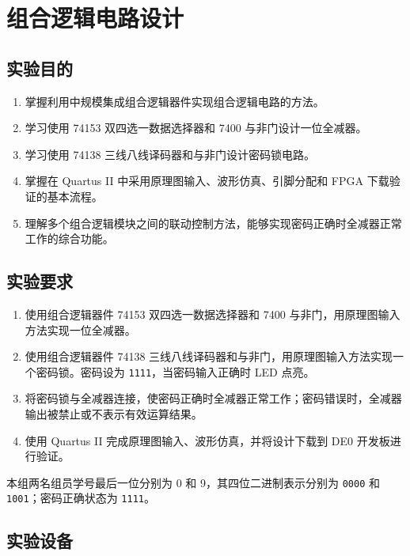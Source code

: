 \documentclass{ctexrep}
\begin{document}
\graphicspath{{../2. sub/figures/}}
\chapter{组合逻辑电路设计}

\section{实验目的}

\begin{enumerate}
    \item 掌握利用中规模集成组合逻辑器件实现组合逻辑电路的方法。
    \item 学习使用 74153 双四选一数据选择器和 7400 与非门设计一位全减器。
    \item 学习使用 74138 三线八线译码器和与非门设计密码锁电路。
    \item 掌握在 Quartus II 中采用原理图输入、波形仿真、引脚分配和 FPGA 下载验证的基本流程。
    \item 理解多个组合逻辑模块之间的联动控制方法，能够实现密码正确时全减器正常工作的综合功能。
\end{enumerate}

\section{实验要求}

\begin{enumerate}
    \item 使用组合逻辑器件 74153 双四选一数据选择器和 7400 与非门，用原理图输入方法实现一位全减器。
    \item 使用组合逻辑器件 74138 三线八线译码器和与非门，用原理图输入方法实现一个密码锁。密码设为 \texttt{1111}，当密码输入正确时 LED 点亮。
    \item 将密码锁与全减器连接，使密码正确时全减器正常工作；密码错误时，全减器输出被禁止或不表示有效运算结果。
    \item 使用 Quartus II 完成原理图输入、波形仿真，并将设计下载到 DE0 开发板进行验证。
\end{enumerate}

本组两名组员学号最后一位分别为 0 和 9，其四位二进制表示分别为 \texttt{0000} 和 \texttt{1001}；密码正确状态为 \texttt{1111}。

\section{实验设备}
\end{document}

